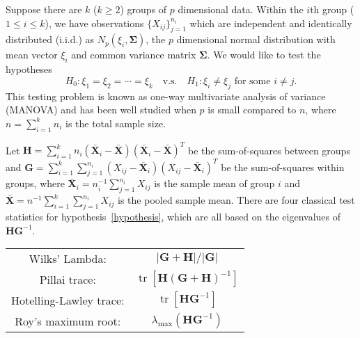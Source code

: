 \documentclass[12pt]{article} %
\DeclareMathOperator{\mytr}{tr}
\newcommand{\bX}{\mathbf{X}}
\newcommand{\bH}{\mathbf{H}}
\newcommand{\bG}{\mathbf{G}}
\newcommand{\bfsym}[1]{\ensuremath{\boldsymbol{#1}}}
\def\bSigma {\bfsym {\Sigma}}
\theoremstyle{definition}
\begin{document}
Suppose there are $k$ ($k\geq 2$) groups of $p$ dimensional data.
Within the $i$th group ($1\leq i\leq k$), we have observations $\{X_{ij}\}_{j=1}^{n_i}$ which are independent and identically distributed (i.i.d.) as $N_p(\xi_i,\bSigma)$, the $p$ dimensional normal distribution with mean vector $\xi_i$ and common variance matrix $\bSigma$.
We would like to test the hypotheses
\begin{equation}\label{hypothesis}
    H_0: \xi_1=\xi_2=\cdots=\xi_k\quad \text{v.s.}\quad　H_1: \text{$\xi_i\neq \xi_j$ for some $i\neq j$}.
\end{equation}
This testing problem is known as one-way multivariate analysis of variance (MANOVA) and has been well studied when $p$ is small compared to $n$, where $n=\sum_{i=1}^k n_i$ is the total sample size.

Let $\bH=\sum_{i=1}^k n_i (\bar{\bX}_i-\bar{\bX})(\bar{\bX}_i-\bar{\bX})^T$ be the sum-of-squares between groups and $\bG=\sum_{i=1}^k \sum_{j=1}^{n_i}(X_{ij}-\bar{\bX}_i)(X_{ij}-\bar{\bX}_i)^T$ be the sum-of-squares within groups, where $\bar{\bX}_i=n_i^{-1}\sum_{j=1}^{n_i}X_{ij}$ is the sample mean of group $i$ and $\bar{\bX}=n^{-1}\sum_{i=1}^k\sum_{j=1}^{n_i}X_{ij}$ is the pooled sample mean.
   There are four classical test statistics for hypothesis~\eqref{hypothesis}, which are all based on the eigenvalues of $\bH\bG^{-1}$. 


       \begin{center}
       \begin{tabular}{|cc|}
           \hline
       {Wilks' Lambda:} & $|\bG+\bH|/|\bG|$\\
       {Pillai trace:} & $\mytr[\bH(\bG+\bH)^{-1}]$\\
       {Hotelling-Lawley trace:} & $\mytr[\bH \bG^{-1}]$\\
       {Roy's maximum root:} & $\lambda_{\max}(\bH \bG^{-1})$\\
           \hline
           \end{tabular}
       \end{center}
\end{document}
